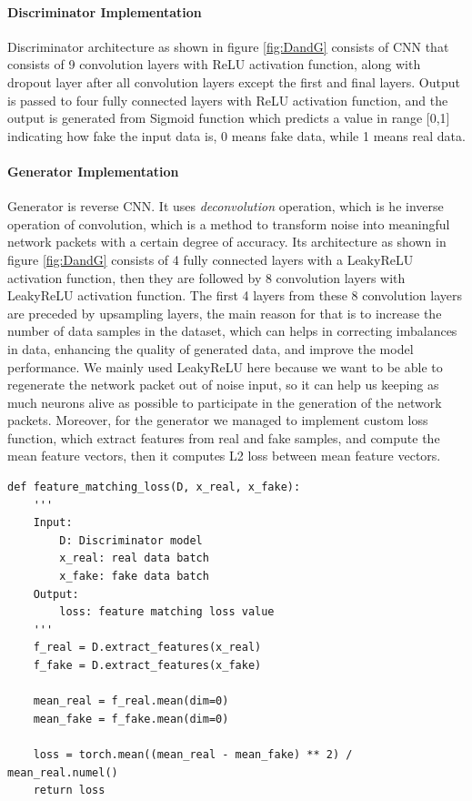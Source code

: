 \paragraph{Discriminator Implementation}
 
 Discriminator architecture as shown in figure \ref{fig:DandG} consists of \ac{CNN} that consists of 9 convolution layers with ReLU activation function, along with dropout layer after all convolution layers except the first and final layers. Output is passed to four fully connected layers with ReLU activation function, and the output is generated from Sigmoid function which predicts a value in range [0,1] indicating how fake the input data is, 0 means fake data, while 1 means real data. 

\paragraph{Generator Implementation} Generator is reverse \ac{CNN}. It uses \textit{deconvolution} operation, which is he inverse operation of convolution, which is a method to transform noise into meaningful network packets with a certain degree of accuracy. Its architecture as shown in figure \ref{fig:DandG}  consists of 4 fully connected layers with a LeakyReLU activation function, then they are followed by 8 convolution layers with LeakyReLU activation function. The first 4 layers from these 8 convolution layers are preceded by upsampling layers, the main reason for that is to increase the number of data samples in the dataset, which can helps in correcting imbalances in data, enhancing the quality of generated data, and improve the model performance.  We mainly used LeakyReLU here because we want to be able to regenerate the network packet out of noise input, so it can help us keeping as much neurons alive as possible to participate in the generation of the network packets. Moreover, for the generator we managed to implement custom loss function, which extract features from real and fake samples, and compute the mean feature vectors, then it computes L2 loss between mean feature vectors. \begin{lstlisting}
def feature_matching_loss(D, x_real, x_fake):
    '''
    Input:
        D: Discriminator model
        x_real: real data batch
        x_fake: fake data batch
    Output:
        loss: feature matching loss value
    '''
    f_real = D.extract_features(x_real)
    f_fake = D.extract_features(x_fake)

    mean_real = f_real.mean(dim=0)
    mean_fake = f_fake.mean(dim=0)

    loss = torch.mean((mean_real - mean_fake) ** 2) / mean_real.numel()
    return loss
\end{lstlisting}



